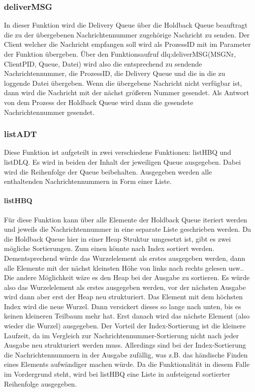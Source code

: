 \subsubsection{deliverMSG}

In dieser Funktion wird die Delivery Queue über die Holdback Queue beauftragt die zu der übergebenen Nachrichtennummer zugehörige Nachricht zu senden. Der Client welcher die Nachricht empfangen soll wird als ProzessID mit im Parameter der Funktion übergeben. 
Über den Funktionsaufruf dlq:deliverMSG(MSGNr, ClientPID, Queue, Datei) wird also die entsprechend zu sendende Nachrichtennummer, die ProzessID, die Delivery Queue und die in die zu loggende Datei übergeben. 
Wenn die übergebene Nachricht nicht verfügbar ist, dann wird die Nachricht mit der nächst größeren Nummer gesendet. 
Als Antwort von dem Prozess der Holdback Queue wird dann die gesendete Nachrichtennummer gesendet. 

\subsubsection{listADT}

Diese Funktion ist aufgeteilt in zwei verschiedene Funktionen: listHBQ und listDLQ. 
Es wird in beiden der Inhalt der jeweiligen Queue ausgegeben. Dabei wird die Reihenfolge der Queue beibehalten. Ausgegeben werden alle enthaltenden Nachrichtennummern in Form einer Liste. 

\paragraph{listHBQ}
Für diese Funktion kann über alle Elemente der Holdback Queue iteriert werden und jeweils die Nachrichtennummer in eine separate Liste geschrieben werden. 
Da die Holdback Queue hier in einer Heap Struktur umgesetzt ist, gibt es zwei mögliche Sortierungen. Zum einen könnte nach Index sortiert werden. Dementsprechend würde das Wurzelelement als erstes ausgegeben werden, dann alle Elemente mit der nächst kleinsten Höhe von links nach rechts gelesen usw..
Die andere Möglichkeit wäre es den Heap bei der Ausgabe zu sortieren. Es würde also das Wurzelelement als erstes ausgegeben werden, vor der nächsten Ausgabe wird dann aber erst der Heap neu strukturiert. Das Element mit dem höchsten Index wird die neue Wurzel. Dann versickert dieses so lange nach unten, bis es keinen kleineren Teilbaum mehr hat. Erst danach wird das nächste Element (also wieder die Wurzel) ausgegeben. 
Der Vorteil der Index-Sortierung ist die kleinere Laufzeit, da im Vergleich zur Nachrichtennummer-Sortierung nicht nach jeder Ausgabe neu strukturiert werden muss. Allerdings sind bei der Index-Sortierung die Nachrichtennummern in der Ausgabe zufällig, was z.B. das händische Finden eines Elements aufwändiger machen würde. 
Da die Funktionalität in diesem Falle im Vordergrund steht, wird bei listHBQ eine Liste in aufsteigend sortierter Reihenfolge ausgegeben. 

